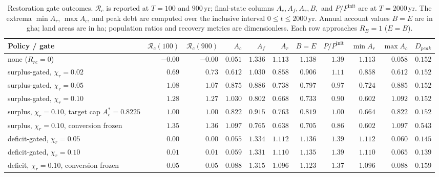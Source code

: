 \documentclass[11pt,a4paper]{article}
\begin{document}
\begin{table}[H]
\centering\scriptsize
\setlength{\tabcolsep}{2pt}
\caption{Restoration gate outcomes. $\mathcal R_c$ is reported at $T=100$ and $900$\,yr; final-state columns $A_c,A_f,A_r,B,$ and $P/P^{\mathrm{init}}$ are at $T=2000$\,yr. The extrema $\min A_r$, $\max A_c$, and peak debt are computed over the inclusive interval $0\le t\le2000$\,yr. Annual account values $B=E$ are in gha; land areas are in ha; population ratios and recovery metrics are dimensionless. Each row approaches $R_B=1$ ($E=B$).}
\label{tab:si_gates}
\begin{tabular}{l r r r r r r r r r r}
\toprule
Policy / gate & $\mathcal R_c(100)$ & $\mathcal R_c(900)$ & $A_c$ & $A_f$ & $A_r$ & $B=E$ & $P/P^{\mathrm{init}}$ & $\min A_r$ & $\max A_c$ & $D_{peak}$ \\
\midrule
none ($R_{rc}=0$) & $-0.00$ & $-0.00$ & $0.051$ & $1.336$ & $1.113$ & $1.138$ & $1.39$ & $1.113$ & $0.058$ & $0.152$ \\
surplus-gated, $\chi_r=0.02$ & $0.69$ & $0.73$ & $0.612$ & $1.030$ & $0.858$ & $0.906$ & $1.11$ & $0.858$ & $0.612$ & $0.152$ \\
surplus-gated, $\chi_r=0.05$ & $1.08$ & $1.07$ & $0.875$ & $0.886$ & $0.738$ & $0.797$ & $0.97$ & $0.724$ & $0.885$ & $0.152$ \\
surplus-gated, $\chi_r=0.10$ & $1.28$ & $1.27$ & $1.030$ & $0.802$ & $0.668$ & $0.733$ & $0.90$ & $0.602$ & $1.092$ & $0.152$ \\
surplus, $\chi_r=0.10$, target cap $A_c^*=0.8225$ & $1.00$ & $1.00$ & $0.822$ & $0.915$ & $0.763$ & $0.819$ & $1.00$ & $0.664$ & $0.822$ & $0.152$ \\
surplus, $\chi_r=0.10$, conversion frozen & $1.35$ & $1.36$ & $1.097$ & $0.765$ & $0.638$ & $0.705$ & $0.86$ & $0.602$ & $1.097$ & $0.543$ \\
deficit-gated, $\chi_r=0.05$ & $0.00$ & $0.00$ & $0.055$ & $1.334$ & $1.112$ & $1.136$ & $1.39$ & $1.112$ & $0.060$ & $0.145$ \\
deficit-gated, $\chi_r=0.10$ & $0.01$ & $0.01$ & $0.059$ & $1.331$ & $1.110$ & $1.135$ & $1.39$ & $1.110$ & $0.065$ & $0.139$ \\
deficit, $\chi_r=0.10$, conversion frozen & $0.05$ & $0.05$ & $0.088$ & $1.315$ & $1.096$ & $1.123$ & $1.37$ & $1.096$ & $0.088$ & $0.159$ \\
\bottomrule
\end{tabular}
\end{table}
\end{document}
